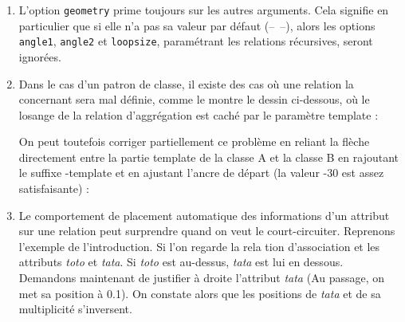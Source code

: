 \documentclass[a4paper,11pt]{report}
\newcommand{\inputTikZ}[1]{%
  }%
\newcommand{\inputTikZ}[1]{%
    \texttt{[image: fig/\#1.pdf]}%
  }%
\begin{document}
\begin{enumerate}
\item L'option {\tt geometry} prime toujours sur les autres arguments. Cela signifie en particulier que si elle n'a pas sa valeur par défaut (--~--), alors les options {\tt angle1}, {\tt angle2} et {\tt loopsize}, paramétrant les relations récursives, seront ignorées.
\item Dans le cas d'un patron de classe, il existe des cas où une relation la concernant sera mal définie, comme le montre le dessin ci-dessous, où le losange de la relation d'aggrégation est caché par le paramètre template :

\begin{minipage}{0.6\textwidth}

\end{minipage}
\begin{minipage}{0.4\textwidth}
\begin{center}
\inputTikZ{figure37}
\end{center}
\end{minipage}

\medskip

On peut toutefois corriger partiellement ce problème en reliant la flèche directement entre la partie template de la classe A et la classe B en rajoutant le suffixe -template et en ajustant l'ancre de départ (la valeur -30 est assez satisfaisante) : 

\medskip

\begin{minipage}{0.6\textwidth}

\end{minipage}
\begin{minipage}{0.4\textwidth}
\begin{center}
\inputTikZ{figure38}
\end{center}
\end{minipage}

\medskip

\item Le comportement de placement automatique des informations d'un attribut sur une relation peut surprendre quand on veut le court-circuiter. Reprenons l'exemple de l'introduction. Si l'on regarde la rela	tion d'association et les attributs {\it toto} et {\it tata}. Si {\it toto} est au-dessus, {\it tata} est lui en dessous. Demandons maintenant de justifier à droite l'attribut {\it tata} (Au passage, on met sa position à 0.1). On constate alors que les positions de {\it tata} et de sa multiplicité s'inversent.

\begin{center}
\inputTikZ{figure39}
\end{center}

\end{enumerate}
\end{document}
